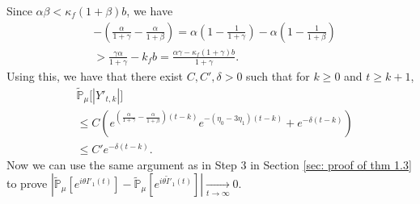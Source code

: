 \documentclass[12pt,a4paper]{amsart}
\theoremstyle{plain}
\theoremstyle{definition}
\numberwithin{equation}{section}
\begin{document}
Since $\alpha\beta<\kappa_f(1+\beta)b$,  we have
\begin{equation}\begin{split}
\label{eq: condition for supercritical}
	&-(\frac{\alpha}{1+\gamma}-\frac{\alpha}{1+\beta})
    = \alpha(1-\frac{1}{1+\gamma}) - \alpha(1-\frac{1}{1+\beta})
    \\&> \frac{\gamma \alpha}{1+\gamma} - k_f b
    =\frac{\alpha \gamma-\kappa_f(1+\gamma)b}{1+\gamma}.
\end{split}\end{equation}
	Using this, we have that there exist $C,C',
    \delta > 0$ such that for $k\geq 0$ and $t\geq k+1$,
\begin{align*}
    &\mathbb{\tilde{P}}_{\mu}\big[|Y'_{t,k}|\big]
    \\& \leq C( e^{(\frac{\alpha}{1+\gamma} - \frac{\alpha}{1+\beta})(t-k)}e^{-(\eta_0 - 3\eta_1)(t-k)}+ e^{-\delta(t-k)})
    \\& \leq C'e^{-\delta (t-k)}.
\end{align*}
Now we can use the same argument as in Step 3 in Section \ref{sec: proof of thm 1.3} to prove $|\mathbb{\tilde{P}}_{\mu}[e^{i\theta I'_1(t)}]-\mathbb{\tilde{P}}_{\mu}[e^{i\theta\tilde I'_1(t)}]|\xrightarrow[t\to \infty]{} 0$.
\end{document}
